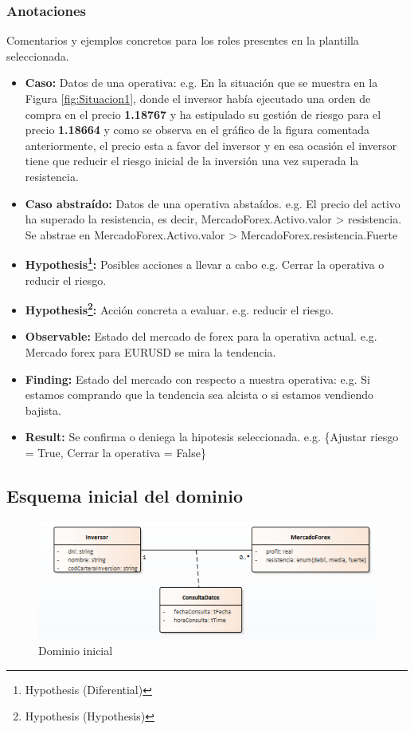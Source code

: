 \subsubsection{Anotaciones}
Comentarios y ejemplos concretos para los roles presentes en la plantilla seleccionada.
\begin{itemize}
  \item \textbf{Caso:} Datos de una operativa: e.g. En la situación que se muestra en la Figura \ref{fig:Situacion1}, donde el inversor había ejecutado una orden de compra en el precio \textbf{1.18767} y ha estipulado su gestión de riesgo para el precio \textbf{1.18664} y como se observa en el gráfico de la figura comentada anteriormente, el precio esta a favor del inversor y en esa ocasión el inversor tiene que reducir el riesgo inicial de la inversión una vez superada la resistencia.
  \item \textbf{Caso abstraído:} Datos de una operativa abstaídos. e.g. El precio del activo ha superado la resistencia, es decir, MercadoForex.Activo.valor > resistencia. Se abstrae en MercadoForex.Activo.valor > MercadoForex.resistencia.Fuerte
  \item \textbf{Hypothesis\footnote{Hypothesis (Diferential)}:} Posibles acciones a llevar a cabo e.g. Cerrar la operativa o reducir el riesgo.
  \item \textbf{Hypothesis\footnote{Hypothesis (Hypothesis)}:} Acción concreta a evaluar. e.g. reducir el riesgo.
  \item \textbf{Observable:} Estado del mercado de forex para la operativa actual. e.g. Mercado forex para EURUSD se mira la tendencia.
  \item \textbf{Finding:} Estado del mercado con respecto a nuestra operativa: e.g. Si estamos comprando que la tendencia sea alcista o si estamos vendiendo bajista.
  \item \textbf{Result:} Se confirma o deniega la hipotesis seleccionada. e.g. \{Ajustar riesgo = True, Cerrar la operativa = False\} 
\end{itemize}

\subsection{Esquema inicial del dominio}

\begin{figure}[H]
  \centering
  \includegraphics[scale=0.90]{imagenes/DominioInicial.png}
  \caption{\label{fig:DominioInicial}Dominio inicial}
\end{figure}


